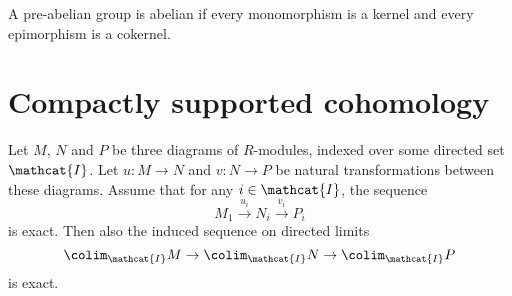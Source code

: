 \begin{definition}
  \label{def:abelian-category}
  A pre-abelian group is abelian if every monomorphism
  is a kernel and every epimorphism is a cokernel.
\end{definition}


\section{Compactly supported cohomology}

\begin{lemma}
  Let $M$, $N$ and $P$ be three diagrams of $R$-modules,
  indexed over some directed set $\mathcat{I}$.
  Let $u\colon M\to N$ and $v\colon N \to P$ be natural
  transformations between these diagrams.
  Assume that for any $i\in \mathcat{I}$,
  the sequence
  \[
    M_1 \xrightarrow{u_i}
    N_i \xrightarrow{v_i}
    P_i
  \]
  is exact.
  Then also the induced sequence on directed limits
  \[
    \colim_{\mathcat{I}} M
    \to
    \colim_{\mathcat{I}} N
    \to
    \colim_{\mathcat{I}} P
  \]
  is exact.
\end{lemma}
